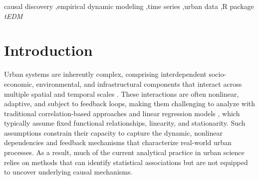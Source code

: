 \documentclass[authoryear,preprint,review,12pt]{elsarticle}
\begin{document}
\begin{frontmatter}
\begin{abstract}
Urban systems are complex, nonlinear, and adaptive, with interactions unfolding across multiple spatial and temporal scales. Traditional correlation-based and regression approaches often fail to capture their dynamic causal structures, limiting understanding of underlying mechanisms. Causal inference provides a more powerful framework, encompassing both causal discovery and causal effect estimation, yet the former remains underexplored in urban studies. Empirical Dynamic Modeling (EDM) is well suited for this task, as it reconstructs system dynamics directly from time series without prespecified models. Despite its potential, EDM has seen limited application in urban contexts. To address this gap, we introduce \textit{tEDM}, an open-source R package that extends EDM to heterogeneous, high-frequency, multivariate, and multi-spatial urban datasets. The package combines a C++ computational backbone with seamless R integration to achieve both efficiency and usability in large-scale urban time series analysis. Its applicability is illustrated through representative case studies on environmental health, carbon-climate dynamics, and epidemic spread, demonstrating how \textit{tEDM} enables nuanced causal discovery and provides methodological as well as practical advances for urban and environmental research. The \textit{tEDM} package is publicly available at \url{https://github.com/stscl/tEDM}.
\end{abstract}

\begin{keyword}
causal discovery \sep empirical dynamic modeling \sep time series \sep urban data \sep R package \textit{tEDM}
\end{keyword}
\end{frontmatter}

\linenumbers

\section{Introduction}\label{sec_intro}

Urban systems are inherently complex, comprising interdependent socio-economic, environmental, and infrastructural components that interact across multiple spatial and temporal scales \citep{mcphearson2016understand_urban_systems}. These interactions are often nonlinear, adaptive, and subject to feedback loops, making them challenging to analyze with traditional correlation-based approaches and linear regression models \citep{gan2025urban_transfer_entropy}, which typically assume fixed functional relationships, linearity, and stationarity. Such assumptions constrain their capacity to capture the dynamic, nonlinear dependencies and feedback mechanisms that characterize real-world urban processes. As a result, much of the current analytical practice in urban science relies on methods that can identify statistical associations but are not equipped to uncover underlying causal mechanisms.
\end{document}
